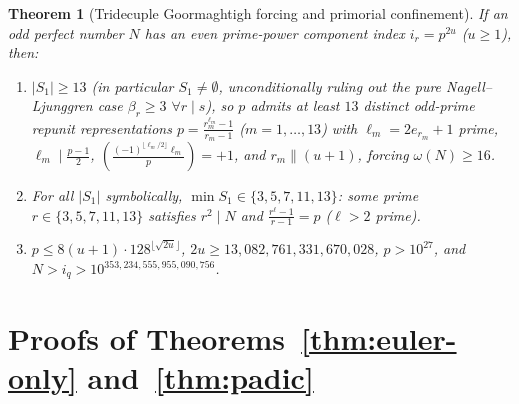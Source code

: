 \documentclass[11pt]{amsart}
\newtheorem{theorem}{Theorem}
\theoremstyle{definition}
\theoremstyle{remark}
\begin{document}
\begin{theorem}[Tridecuple Goormaghtigh forcing and primorial confinement]\label{thm:tridecuple}
If an odd perfect number $N$ has an even prime-power component index $i_r = p^{2u}$ ($u \ge 1$), then:
\begin{enumerate}
  \item $|S_1| \ge 13$ (in particular $S_1 \ne \emptyset$, unconditionally ruling out the pure Nagell--Ljunggren case $\beta_r \ge 3$ $\forall r \mid s$), so $p$ admits at least $13$ distinct odd-prime repunit representations $p = \frac{r_m^{\ell_m} - 1}{r_m - 1}$ ($m = 1, \dots, 13$) with $\ell_m = 2 e_{r_m} + 1$ prime, $\ell_m \mid \frac{p - 1}{2}$, $\left(\frac{(-1)^{\lfloor \ell_m/2 \rfloor}\ell_m}{p}\right) = +1$, and $r_m \parallel (u + 1)$, forcing $\omega(N) \ge 16$.
  \item For all $|S_1|$ symbolically, $\min S_1 \in \{3, 5, 7, 11, 13\}$: some prime $r \in \{3, 5, 7, 11, 13\}$ satisfies $r^2 \mid N$ and $\frac{r^\ell - 1}{r - 1} = p$ ($\ell > 2$ prime).
  \item $p \le 8(u + 1) \cdot 128^{\lfloor \sqrt{2u} \rfloor}$, $2u \ge 13{,}082{,}761{,}331{,}670{,}028$, $p > 10^{27}$, and $N > i_q > 10^{353{,}234{,}555{,}955{,}090{,}756}$.
\end{enumerate}
\end{theorem}

\section{Proofs of Theorems~\ref{thm:euler-only} and~\ref{thm:padic}}
\end{document}
